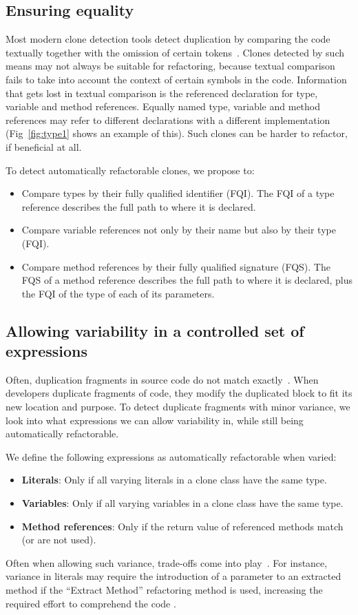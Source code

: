 \documentclass[sigconf,review,anonymous]{acmart}
\begin{document}
\subsection{Ensuring equality}\label{sec:t1r}
Most modern clone detection tools detect duplication by comparing the code textually together with the omission of certain tokens~\cite{roy2009comparison, svajlenko2014evaluating}. Clones detected by such means may not always be suitable for refactoring, because textual comparison fails to take into account the context of certain symbols in the code. Information that gets lost in textual comparison is the referenced declaration for type, variable and method references. Equally named type, variable and method references may refer to different declarations with a different implementation (Fig~\ref{fig:type1} shows an example of this). Such clones can be harder to refactor, if beneficial at all.

To detect automatically refactorable clones, we propose to:
\begin{itemize}
  \item Compare types by their fully qualified identifier (FQI). The FQI of a type reference describes the full path to where it is declared.
  \item Compare variable references not only by their name but also by their type (FQI).
  \item Compare method references by their fully qualified signature (FQS). The FQS of a method reference describes the full path to where it is declared, plus the FQI of the type of each of its parameters.
\end{itemize}

\subsection{Allowing variability in a controlled set of expressions} \label{sec:t2r}
Often, duplication fragments in source code do not match exactly~\cite{kodhai2013method}. When developers duplicate fragments of code, they modify the duplicated block to fit its new location and purpose. To detect duplicate fragments with minor variance, we look into what expressions we can allow variability in, while still being automatically refactorable.

We define the following expressions as automatically refactorable when varied:
\begin{itemize}
  \item \textbf{Literals}: Only if all varying literals in a clone class have the same type.
  \item \textbf{Variables}: Only if all varying variables in a clone class have the same type.
  \item \textbf{Method references}: Only if the return value of referenced methods match (or are not used).
\end{itemize}
Often when allowing such variance, trade-offs come into play~\cite{krishnan2013refactoring, krishnan2014unification}. For instance, variance in literals may require the introduction of a parameter to an extracted method if the ``Extract Method'' refactoring method is used, increasing the required effort to comprehend the code \cite{heitlager2007practical}.
\end{document}
